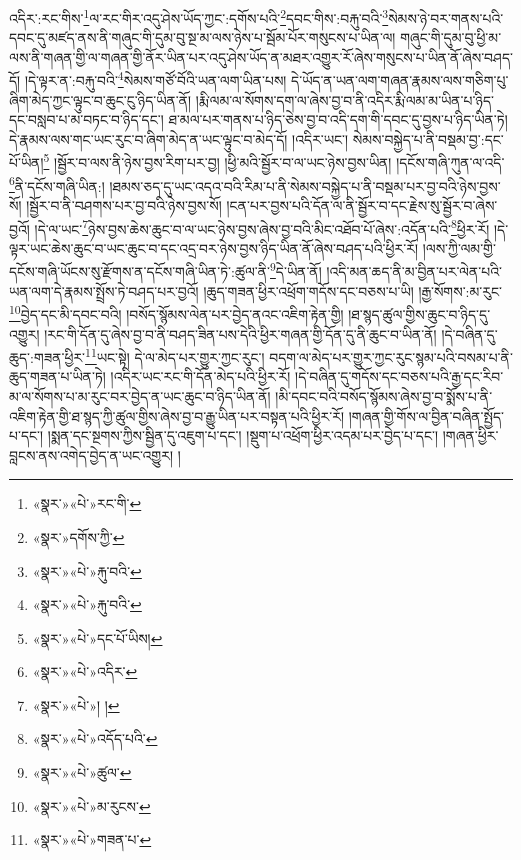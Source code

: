 འདིར་:རང་གིས་\footnote{«སྣར་»«པེ་»རང་གི་}ལ་རང་གིར་འདུ་ཤེས་ཡོད་ཀྱང་:དགོས་པའི་\footnote{«སྣར་»དགོས་ཀྱི་}དབང་གིས་:བརྐུ་བའི་\footnote{«སྣར་»«པེ་»རྐུ་བའི་}སེམས་ཉེ་བར་གནས་པའི་དབང་དུ་མཛད་ནས་ནི་གཞུང་གི་དུམ་བུ་སྔ་མ་ལས་ཉེས་པ་སྦོམ་པོར་གསུངས་པ་ཡིན་ལ། གཞུང་གི་དུམ་བུ་ཕྱི་མ་ལས་ནི་གཞན་གྱི་ལ་གཞན་གྱི་ནོར་ཡིན་པར་འདུ་ཤེས་ཡོད་ན་མཐར་འགྱུར་རོ་ཞེས་གསུངས་པ་ཡིན་ནོ་ཞེས་བཤད་དོ། །དེ་ལྟར་ན་:བརྐུ་བའི་\footnote{«སྣར་»«པེ་»རྐུ་བའི་}སེམས་གཙོ་བོའི་ཡན་ལག་ཡིན་པས། དེ་ཡོད་ན་ཡན་ལག་གཞན་རྣམས་ལས་གཅིག་པུ་ཞིག་མེད་ཀྱང་ལྟུང་བ་ཆུང་ངུ་ཉིད་ཡིན་ནོ། །རྨི་ལམ་ལ་སོགས་དག་ལ་ཞེས་བྱ་བ་ནི་འདིར་རྨི་ལམ་མ་ཡིན་པ་ཉིད་དང་བསླབ་པ་མ་བཏང་བ་ཉིད་དང་། ཐ་མལ་པར་གནས་པ་ཉིད་ཅེས་བྱ་བ་འདི་དག་གི་དབང་དུ་བྱས་པ་ཉིད་ཡིན་ཏེ། དེ་རྣམས་ལས་གང་ཡང་རུང་བ་ཞིག་མེད་ན་ཡང་ལྟུང་བ་མེད་དོ། །འདིར་ཡང་། སེམས་བསྐྱེད་པ་ནི་བསྡམ་བྱ་:དང་པོ་ཡིན།\footnote{«སྣར་»«པེ་»དང་པོ་ཡིས།} །སྦྱོར་བ་ལས་ནི་ཉེས་བྱས་རིག་པར་བྱ། །ཕྱི་མའི་སྦྱོར་བ་ལ་ཡང་ཉེས་བྱས་ཡིན། །དངོས་གཞི་ཀུན་ལ་འདི་\footnote{«སྣར་»«པེ་»འདིར་}ནི་དངོས་གཞི་ཡིན:། །ཐམས་ཅད་དུ་ཡང་འདའ་བའི་རིམ་པ་ནི་སེམས་བསྐྱེད་པ་ནི་བསྡམ་པར་བྱ་བའི་ཉེས་བྱས་སོ། །སྦྱོར་བ་ནི་བཤགས་པར་བྱ་བའི་ཉེས་བྱས་སོ། །ངན་པར་བྱས་པའི་དོན་ལ་ནི་སྦྱོར་བ་དང་རྗེས་སུ་སྦྱོར་བ་ཞེས་བྱའོ། །དེ་ལ་ཡང་\footnote{«སྣར་»«པེ་»། །}ཉེས་བྱས་ཆེས་ཆུང་བ་ལ་ཡང་ཉེས་བྱས་ཞེས་བྱ་བའི་མིང་འཐོབ་པོ་ཞེས་:འདོན་པའི་\footnote{«སྣར་»«པེ་»འདོད་པའི་}ཕྱིར་རོ། །དེ་ལྟར་ཡང་ཆེས་ཆུང་བ་ཡང་ཆུང་བ་དང་འདྲ་བར་ཉེས་བྱས་ཉིད་ཡིན་ནོ་ཞེས་བཤད་པའི་ཕྱིར་རོ། །ལས་ཀྱི་ལམ་གྱི་དངོས་གཞི་ཡོངས་སུ་རྫོགས་ན་དངོས་གཞི་ཡིན་ཏེ་:ཚུལ་ནི་\footnote{«སྣར་»«པེ་»ཚུལ་}དེ་ཡིན་ནོ། །འདི་མན་ཆད་ནི་མ་བྱིན་པར་ལེན་པའི་ཡན་ལག་དེ་རྣམས་སྤྲོས་ཏེ་བཤད་པར་བྱའོ། །ཆུད་གཟན་ཕྱིར་འཕྲོག་གདོས་དང་བཅས་པ་ཡི། །རྒྱ་སོགས་:མ་རུང་\footnote{«སྣར་»«པེ་»མ་རུངས་}བྱེད་དང་མི་དབང་བའི། །བསོད་སྙོམས་ལེན་པར་བྱེད་ནའང་འཇིག་རྟེན་གྱི། །ཐ་སྙད་ཚུལ་གྱིས་ཆུང་བ་ཉིད་དུ་འགྱུར། །རང་གི་དོན་དུ་ཞེས་བྱ་བ་ནི་བཤད་ཟིན་པས་དེའི་ཕྱིར་གཞན་གྱི་དོན་དུ་ནི་ཆུང་བ་ཡིན་ནོ། །དེ་བཞིན་དུ་ཆུད་:གཟན་ཕྱིར་\footnote{«སྣར་»«པེ་»གཟན་པ་}ཡང་སྟེ། དེ་ལ་མེད་པར་གྱུར་ཀྱང་རུང་། བདག་ལ་མེད་པར་གྱུར་ཀྱང་རུང་སྙམ་པའི་བསམ་པ་ནི་ཆུད་གཟན་པ་ཡིན་ཏེ། །འདིར་ཡང་རང་གི་དོན་མེད་པའི་ཕྱིར་རོ། །དེ་བཞིན་དུ་གདོས་དང་བཅས་པའི་རྒྱ་དང་རིབ་མ་ལ་སོགས་པ་མ་རུང་བར་བྱེད་ན་ཡང་ཆུང་བ་ཉིད་ཡིན་ནོ། །མི་དབང་བའི་བསོད་སྙོམས་ཞེས་བྱ་བ་སྨོས་པ་ནི་འཇིག་རྟེན་གྱི་ཐ་སྙད་ཀྱི་ཚུལ་གྱིས་ཞེས་བྱ་བ་རྒྱུ་ཡིན་པར་བསྟན་པའི་ཕྱིར་རོ། །གཞན་གྱི་གོས་ལ་བྱིན་བཞིན་སྤྱོད་པ་དང་། །སྨན་དང་སྔགས་ཀྱིས་སྦྱིན་དུ་འཇུག་པ་དང་། །སྡུག་པ་འཕྲོག་ཕྱིར་འདམ་པར་བྱེད་པ་དང་། །གཞན་ཕྱིར་བླངས་ནས་འགེད་བྱེད་ན་ཡང་འགྱུར། །
